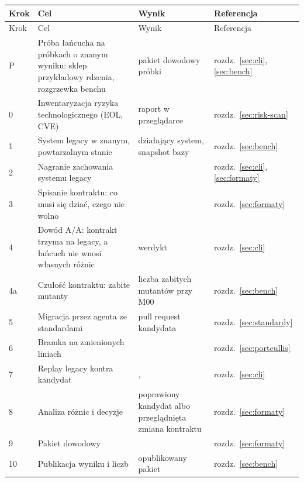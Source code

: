 \begin{xltabular}{\linewidth}{@{}p{1.2cm} >{\raggedright\arraybackslash}X >{\raggedright\arraybackslash}p{3.6cm} >{\raggedright\arraybackslash}p{3.3cm}@{}}
\toprule
Krok & Cel & Wynik & Referencja \\
\midrule
\endfirsthead
\toprule
Krok & Cel & Wynik & Referencja \\
\midrule
\endhead
P & Próba łańcucha na próbkach o znanym wyniku: sklep przykładowy rdzenia, rozgrzewka benchu & pakiet dowodowy próbki & rozdz.~\ref{sec:cli}, \ref{sec:bench} \\
0 & Inwentaryzacja ryzyka technologicznego (EOL, CVE) & raport w przeglądarce & rozdz.~\ref{sec:risk-scan} \\
1 & System legacy w znanym, powtarzalnym stanie & działający system, snapshot bazy & rozdz.~\ref{sec:bench} \\
2 & Nagranie zachowania systemu legacy &  & rozdz.~\ref{sec:cli}, \ref{sec:formaty} \\
3 & Spisanie kontraktu: co musi się dziać, czego nie wolno &  & rozdz.~\ref{sec:formaty} \\
4 & Dowód A/A: kontrakt trzyma na legacy, a łańcuch nie wnosi własnych różnic & werdykt  & rozdz.~\ref{sec:cli} \\
4a & Czułość kontraktu: zabite mutanty & liczba zabitych mutantów przy M00  & rozdz.~\ref{sec:bench} \\
5 & Migracja przez agenta ze standardami & pull request kandydata & rozdz.~\ref{sec:standardy} \\
6 & Bramka na zmienionych liniach &  & rozdz.~\ref{sec:portcullis} \\
7 & Replay legacy kontra kandydat & ,  & rozdz.~\ref{sec:cli} \\
8 & Analiza różnic i decyzje & poprawiony kandydat albo przeglądnięta zmiana kontraktu & rozdz.~\ref{sec:formaty} \\
9 & Pakiet dowodowy &  & rozdz.~\ref{sec:formaty} \\
10 & Publikacja wyniku i liczb & opublikowany pakiet & rozdz.~\ref{sec:bench} \\
\bottomrule
\end{xltabular}


